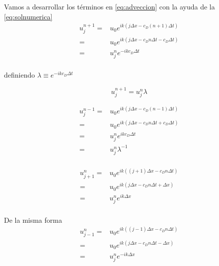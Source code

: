 \documentclass{article}
\begin{document}
Vamos a desarrollar los términos en \eqref{eq:adveccion} con la ayuda de la \autoref{eq:solnumerica}
\begin{equation}
	\begin{split}
	u_{j}^{n+1} = & u_0 e^{ik(j\Delta x - c_D (n+1) \Delta t)} \\
		=& u_0 e^{ik(j\Delta x - c_D n\Delta t - c_D\Delta t)} \\
		=& u_{j}^{n} e^{-ik c_D\Delta t} \\
	\end{split}
\end{equation}

definiendo $
	\lambda \equiv e^{-ik c_D\Delta t}
$

\begin{equation}
	u_{j}^{n+1} = u_{j}^{n} \lambda
\end{equation}

\begin{equation}
	\begin{split}
	u_{j}^{n-1} = & u_0 e^{ik(j\Delta x - c_D (n-1) \Delta t)} \\
		=& u_0 e^{ik(j\Delta x - c_D n\Delta t + c_D\Delta t)} \\
		=& u_{j}^{n} e^{ik c_D\Delta t} \\
		=& u_{j}^{n} \lambda^{-1} \\
	\end{split}
\end{equation}

\begin{equation}
	\begin{split}
	u_{j+1}^{n} = & u_0 e^{ik((j+1)\Delta x - c_D n \Delta t)} \\
		=& u_0 e^{ik(j\Delta x - c_D n\Delta t +\Delta x)} \\
		=& u_{j}^{n} e^{ik \Delta x} \\
	\end{split}
\end{equation}

De la misma forma 
\begin{equation}
	\begin{split}
	u_{j-1}^{n} = & u_0 e^{ik((j-1)\Delta x - c_D n \Delta t)} \\
		= & u_0 e^{ik(j\Delta x - c_D n\Delta t - \Delta x)} \\
		= & u_{j}^{n} e^{-ik \Delta x} \\
	\end{split}
\end{equation}
\end{document}
